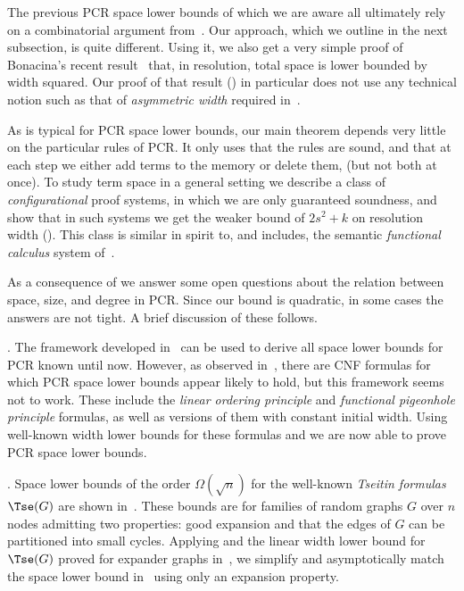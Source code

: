 The previous PCR space lower bounds of which we are aware
all ultimately rely on a combinatorial argument from~\cite{ABRW}. 
Our approach, which we outline in the next subsection,
is quite different.
Using it, we also get a very simple proof of Bonacina's recent 
result~\cite{DBLP:conf/icalp/Bonacina16} that, in resolution, total space is lower bounded by width squared.  Our proof of that result () in particular
does not use any technical notion such as that of \emph{asymmetric width} required 
in~\cite{DBLP:conf/icalp/Bonacina16}.

As is typical for PCR space lower bounds, our main theorem depends very little
on the particular rules of PCR. It only uses that the rules are sound, and 
that at each step we either add terms to the memory or delete them,
(but not both at once). 
To study term space in a general setting we
describe a class of \emph{configurational} proof systems,
in which we are only guaranteed soundness,
and show that in such systems we get the weaker bound of $2s^2+k$
on resolution width ().
This class is similar in spirit to, and includes, the semantic
\emph{functional calculus} system of~\cite{ABRW}.
     
As a consequence of  we answer 
some open questions about the relation between space, size, and degree in PCR. Since our bound is quadratic, 
in some cases the answers are not tight. A brief discussion of these follows.

\smallskip 
{}.
The framework developed in~\cite{DBLP:journals/jacm/BonacinaG15} can be used to derive all space lower bounds for PCR known until now. 
However, as observed in~\cite{DBLP:conf/icalp/FilmusLMNV13}, there are CNF formulas 
for which PCR space lower bounds appear likely to hold, 
but this framework seems not to work.  
These include the \emph{linear ordering principle}
and \emph{functional pigeonhole principle} formulas, as well as
versions of them  with constant initial width.  Using well-known width lower bounds for these formulas \cite{DBLP:journals/cc/BonetG01,DBLP:journals/tocl/GalesiL10,DBLP:journals/tcs/Razborov03,DBLP:journals/siamcomp/SegerlindBI04,DBLP:conf/coco/MiksaN15}  and  we are 
now able to prove PCR space lower bounds. 

\smallskip 
{}.
Space lower bounds of the order $\Omega(\sqrt{n})$ for the well-known \emph{Tseitin formulas} $\Tse(G)$ are shown
in~\cite{DBLP:conf/icalp/FilmusLMNV13}. These bounds are for families of random graphs $G$ over $n$
nodes admitting two properties:  good expansion and that the edges of $G$  can be partitioned into small cycles. Applying  and the linear width lower bound  for $\Tse(G)$ proved for expander graphs in~\cite{DBLP:journals/jacm/Ben-SassonW01}, we simplify and asymptotically match the space lower bound in~\cite{DBLP:conf/icalp/FilmusLMNV13} using only an
expansion property.
 

